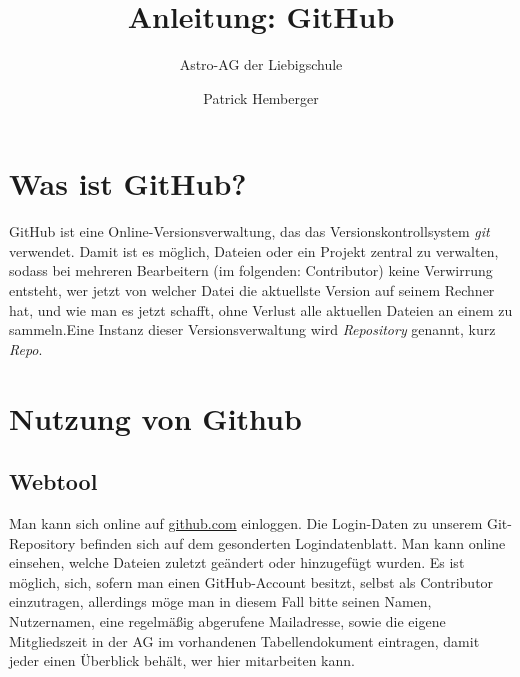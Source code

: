 \documentclass[12pt,a4paper,notitlepage,onecolumn,portrait,oneside, , , ]{scrartcl}
\begin{document}
\title{Anleitung: GitHub}
	\subtitle{Astro-AG der Liebigschule}
\author{Patrick Hemberger}

\maketitle

\section{Was ist GitHub?}
GitHub ist eine Online-Versionsverwaltung, das das Versionskontrollsystem \textit{git} verwendet. Damit ist es möglich, Dateien oder ein Projekt zentral zu verwalten, sodass bei mehreren Bearbeitern (im folgenden: Contributor) keine Verwirrung entsteht, wer jetzt von welcher Datei die aktuellste Version auf seinem Rechner hat, und wie man es jetzt schafft, ohne Verlust alle aktuellen Dateien an einem zu sammeln.Eine Instanz dieser Versionsverwaltung wird \textit{Repository} genannt, kurz \textit{Repo}.

\section{Nutzung von Github}
\subsection{Webtool}
Man kann sich online auf \url{github.com} einloggen. Die Login-Daten zu unserem Git-Repository befinden sich auf dem gesonderten Logindatenblatt. Man kann online einsehen, welche Dateien zuletzt geändert oder hinzugefügt wurden. Es ist möglich, sich, sofern man einen GitHub-Account besitzt, selbst als Contributor einzutragen, allerdings möge man in diesem Fall bitte seinen Namen, Nutzernamen, eine regelmäßig abgerufene Mailadresse, sowie die eigene Mitgliedszeit in der AG im vorhandenen Tabellendokument eintragen, damit jeder einen Überblick behält, wer hier mitarbeiten kann.
\end{document}
